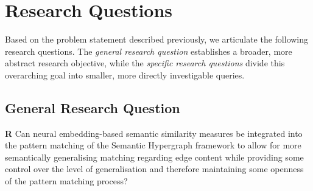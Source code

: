 \documentclass[11pt, numbers=noenddot]{scrreprt}
\begin{document}
\section{Research Questions}
\label{sec:research-questions}
Based on the problem statement described previously, we articulate the following research questions. The \textit{general research question} establishes a broader, more abstract research objective, while the \textit{specific research questions} divide this overarching goal into smaller, more directly investigable queries.

\subsection{General Research Question}
\textbf{R} Can neural embedding-based semantic similarity measures be integrated into the pattern matching of the Semantic Hypergraph framework to allow for more semantically generalising matching regarding edge content while providing some control over the level of generalisation and therefore maintaining some openness of the pattern matching process?
\end{document}
